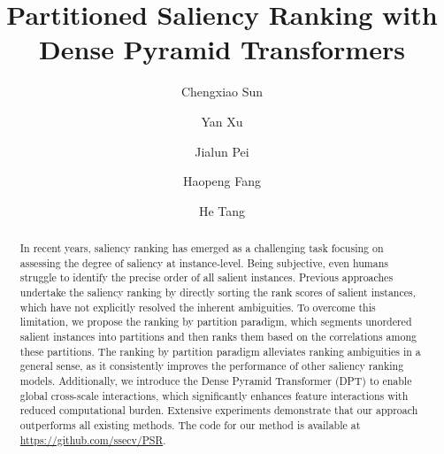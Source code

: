 \documentclass[sigconf]{acmart}
\begin{document}
\title{Partitioned Saliency Ranking with Dense Pyramid Transformers}

\author{Chengxiao Sun}


\author{Yan Xu}
\authornotemark[1]


\author{Jialun Pei}

\author{Haopeng Fang}

\author{He Tang}


\begin{abstract}
In recent years, saliency ranking has emerged as a challenging task focusing on assessing the degree of saliency at instance-level. Being subjective, even humans struggle to identify the precise order of all salient instances. Previous approaches undertake the saliency ranking by directly sorting the rank scores of salient instances, which have not explicitly resolved the inherent ambiguities. To overcome this limitation, we propose the ranking by partition paradigm, which segments unordered salient instances into partitions and then ranks them based on the correlations among these partitions. The ranking by partition paradigm alleviates ranking ambiguities in a general sense,  as it consistently improves the performance of other saliency ranking models. Additionally, we introduce the Dense Pyramid Transformer (DPT) to enable global cross-scale interactions, which significantly enhances feature interactions with reduced computational burden. Extensive experiments demonstrate that our approach outperforms all existing methods. The code for our method is available at \url{https://github.com/ssecv/PSR}.

\end{abstract}
\end{document}
